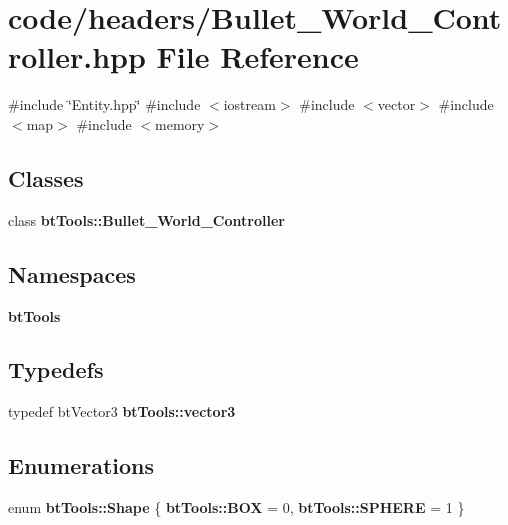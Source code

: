 \section{code/headers/\+Bullet\+\_\+\+World\+\_\+\+Controller.hpp File Reference}
\label{_bullet___world___controller_8hpp}
{\ttfamily \#include \char`\"{}Entity.\+hpp\char`\"{}}\newline
{\ttfamily \#include $<$iostream$>$}\newline
{\ttfamily \#include $<$vector$>$}\newline
{\ttfamily \#include $<$map$>$}\newline
{\ttfamily \#include $<$memory$>$}\newline
\subsection*{Classes}
\begin{DoxyCompactItemize}
\item 
class \textbf{ bt\+Tools\+::\+Bullet\+\_\+\+World\+\_\+\+Controller}
\end{DoxyCompactItemize}
\subsection*{Namespaces}
\begin{DoxyCompactItemize}
\item 
 \textbf{ bt\+Tools}
\end{DoxyCompactItemize}
\subsection*{Typedefs}
\begin{DoxyCompactItemize}
\item 
typedef bt\+Vector3 \textbf{ bt\+Tools\+::vector3}
\end{DoxyCompactItemize}
\subsection*{Enumerations}
\begin{DoxyCompactItemize}
\item 
enum \textbf{ bt\+Tools\+::\+Shape} \{ \textbf{ bt\+Tools\+::\+B\+OX} = 0, 
\textbf{ bt\+Tools\+::\+S\+P\+H\+E\+RE} = 1
 \}
\end{DoxyCompactItemize}

